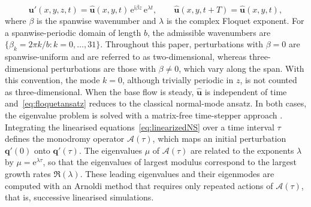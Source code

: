 \documentclass[lineno]{jfm}
\begin{document}
\begin{equation}\label{eq:floquetansatz}
	\boldsymbol{u}'(x,y,z,t)
	= \hat{\boldsymbol{u}}(x,y,t)\,\mathrm{e}^{\mathrm{i}\beta z}\,\mathrm{e}^{\lambda t},
	\qquad
	\hat{\boldsymbol{u}}(x,y,t+T)=\hat{\boldsymbol{u}}(x,y,t),
\end{equation}
where $\beta$ is the spanwise wavenumber and $\lambda$ is the complex Floquet exponent. For a spanwise-periodic domain of length $b$, the admissible wavenumbers are $\{\beta_k = 2\pi k/b : k=0,\ldots,31\}$. Throughout this paper, perturbations with $\beta=0$ are spanwise-uniform and are referred to as two-dimensional, whereas three-dimensional perturbations are those with $\beta\neq0$, which vary along the span. With this convention, the mode $k=0$, although trivially periodic in $z$, is not counted as three-dimensional. When the base flow is steady, $\hat{\boldsymbol{u}}$ is independent of time and~\eqref{eq:floquetansatz} reduces to the classical normal-mode ansatz. In both cases, the eigenvalue problem is solved with a matrix-free time-stepper approach \citep{tuckermanBarkley2000,barkleyBlackburnSherwin2008}. Integrating the linearised equations~\eqref{eq:linearizedNS} over a time interval $\tau$ defines the monodromy operator $\mathcal{A}(\tau)$, which maps an initial perturbation $\boldsymbol{q}'(0)$ onto $\boldsymbol{q}'(\tau)$. The eigenvalues $\mu$ of $\mathcal{A}(\tau)$ are related to the exponents $\lambda$ by $\mu=\mathrm{e}^{\lambda\tau}$, so that the eigenvalues of largest modulus correspond to the largest growth rates $\Re(\lambda)$. These leading eigenvalues and their eigenmodes are computed with an Arnoldi method that requires only repeated actions of $\mathcal{A}(\tau)$, that is, successive linearised simulations.
\end{document}
